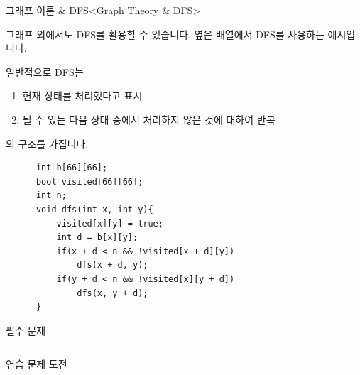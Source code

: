 \begin{frame}[fragile]{그래프 이론 \& DFS}{<Graph Theory \& DFS>}
  \begin{twocol}
    그래프 외에서도 DFS를 활용할 수 있습니다. 옆은 배열에서 DFS를 사용하는 예시입니다.
    \par\vspace{4mm}
    일반적으로 DFS는
    \begin{enumerate}
      \item 현재 상태를 처리했다고 표시
      \item 될 수 있는 다음 상태 중에서 처리하지 않은 것에 대하여 반복
    \end{enumerate}
    의 구조를 가집니다.
  \colsplit
    \begin{verbatim}
      int b[66][66];
      bool visited[66][66];
      int n;
      void dfs(int x, int y){
          visited[x][y] = true;
          int d = b[x][y];
          if(x + d < n && !visited[x + d][y])
              dfs(x + d, y);
          if(y + d < n && !visited[x][y + d])
              dfs(x, y + d);
      }
    \end{verbatim}
  \end{twocol}
\end{frame}


\begin{frame}{필수 문제}
  \begin{columns}[T]
  \end{columns}
\end{frame}

\begin{frame}{연습 문제 도전}
  \begin{columns}[T]
  \end{columns}
\end{frame}

